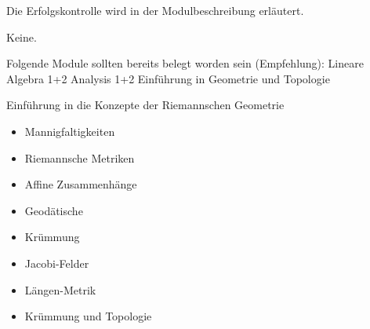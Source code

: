 \begin{course}

\setdoclanguagegerman
{}


\courselevel{}
\courseinstructionlanguage{}

\coursehead


\label{cour_7979.dp_997}


\begin{styleenv}
\begin{assessment}
Die Erfolgskontrolle wird in der Modulbeschreibung erläutert.


\end{assessment}

\begin{conditions}Keine.\end{conditions}

\begin{recommendations}Folgende Module sollten bereits belegt worden sein (Empfehlung):\newline
Lineare Algebra 1+2\newline
Analysis 1+2\newline
Einführung in Geometrie und Topologie

\end{recommendations}
\end{styleenv}

\begin{learningoutcomes}
Einführung in die Konzepte der Riemannschen Geometrie


\end{learningoutcomes}

\begin{content}
\begin{itemize}\item Mannigfaltigkeiten  \item Riemannsche Metriken  \item Affine Zusammenhänge  \item Geodätische  \item Krümmung  \item Jacobi-Felder  \item Längen-Metrik  \item Krümmung und Topologie  \end{itemize}
\end{content}







\end{course}